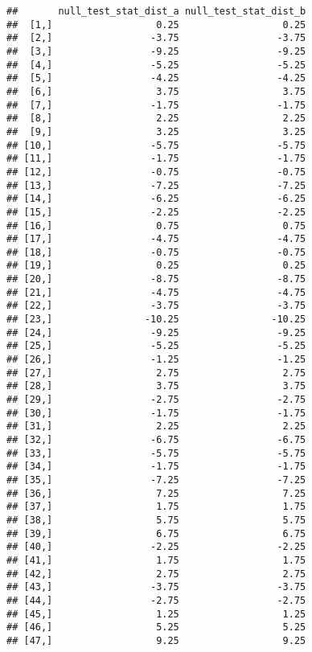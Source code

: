 \documentclass[12pt,leqno]{article}
\theoremstyle{newstyle}
\begin{document}
\begin{verbatim}
##       null_test_stat_dist_a null_test_stat_dist_b
##  [1,]                  0.25                  0.25
##  [2,]                 -3.75                 -3.75
##  [3,]                 -9.25                 -9.25
##  [4,]                 -5.25                 -5.25
##  [5,]                 -4.25                 -4.25
##  [6,]                  3.75                  3.75
##  [7,]                 -1.75                 -1.75
##  [8,]                  2.25                  2.25
##  [9,]                  3.25                  3.25
## [10,]                 -5.75                 -5.75
## [11,]                 -1.75                 -1.75
## [12,]                 -0.75                 -0.75
## [13,]                 -7.25                 -7.25
## [14,]                 -6.25                 -6.25
## [15,]                 -2.25                 -2.25
## [16,]                  0.75                  0.75
## [17,]                 -4.75                 -4.75
## [18,]                 -0.75                 -0.75
## [19,]                  0.25                  0.25
## [20,]                 -8.75                 -8.75
## [21,]                 -4.75                 -4.75
## [22,]                 -3.75                 -3.75
## [23,]                -10.25                -10.25
## [24,]                 -9.25                 -9.25
## [25,]                 -5.25                 -5.25
## [26,]                 -1.25                 -1.25
## [27,]                  2.75                  2.75
## [28,]                  3.75                  3.75
## [29,]                 -2.75                 -2.75
## [30,]                 -1.75                 -1.75
## [31,]                  2.25                  2.25
## [32,]                 -6.75                 -6.75
## [33,]                 -5.75                 -5.75
## [34,]                 -1.75                 -1.75
## [35,]                 -7.25                 -7.25
## [36,]                  7.25                  7.25
## [37,]                  1.75                  1.75
## [38,]                  5.75                  5.75
## [39,]                  6.75                  6.75
## [40,]                 -2.25                 -2.25
## [41,]                  1.75                  1.75
## [42,]                  2.75                  2.75
## [43,]                 -3.75                 -3.75
## [44,]                 -2.75                 -2.75
## [45,]                  1.25                  1.25
## [46,]                  5.25                  5.25
## [47,]                  9.25                  9.25

\end{verbatim}
\end{document}
